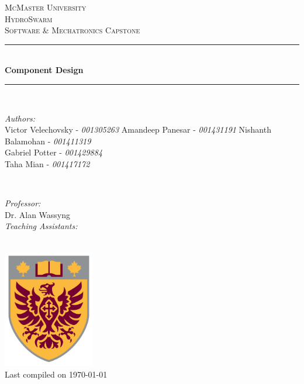 \documentclass[11pt]{article}
\begin{document}
\begin{titlepage}
	\newcommand{\HRule}{\rule{\linewidth}{0.2mm}}
	\begin{center}
	\textsc{\LARGE McMaster University}\\[1.5cm]

	\textsc{\Large HydroSwarm}\\[0.5cm]
	\textsc{\large Software \& Mechatronics Capstone}\\[0.5cm]

	\HRule\\[0.4cm]
		{\huge\bfseries Component Design}\\[0.4cm]
	\HRule\\[0.4cm]

	\begin{minipage}[t][][t]{0.5\textwidth}
		\begin{flushleft} \large
			\emph{Authors:}\\
			Victor Velechovsky - \textit{001305263}
			Amandeep Panesar - \textit{001431191}
			Nishanth Balamohan - \textit{001411319} \\
			Gabriel Potter - \textit{001429884} \\
			Taha Mian - \textit{001417172}
		\end{flushleft}
	\end{minipage}
	~
	\begin{minipage}[t][][t]{0.4\textwidth}
		\begin{flushright} \large
			\emph{Professor:} \\
			Dr. Alan Wassyng \\[0.4cm]
			\emph{Teaching Assistants:} \\
		\end{flushright}
	\end{minipage}\\[2cm]

	\includegraphics[width=0.3\textwidth]{img/logo.png} \\
	{\large Last compiled on \today}
	\end{center}

\end{titlepage}
\end{document}
